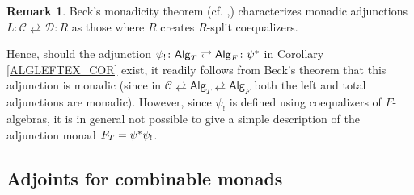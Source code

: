 \documentclass[a4paper,10pt
,draft
]{article}%
\numberwithin{equation}{section}
\numberwithin{figure}{section}
\theoremstyle{definition} %
\newtheorem{remark}[equation]{Remark}%
\newcommand{\Alg}{\mathsf{Alg}}
\newcommand{\1}{\ensuremath{\mathbbm 1}}%
\begin{document}


\begin{remark}\label{ADJSRMON REM}
Beck's monadicity theorem (cf. \cite[VI.7 Thm. 1]{McL},\cite[Thm. 5.5.1]{Ri17})
characterizes monadic adjunctions $L\colon \mathcal{C} \rightleftarrows \mathcal{D}\colon R$
as those where $R$ creates $R$-split coequalizers. 

Hence, should the adjunction 
$\psi_! \colon \Alg_T \rightleftarrows \Alg_F \colon \psi^{\**}$
in Corollary \ref{ALGLEFTEX_COR} exist,
it readily follows from Beck's theorem that this adjunction is monadic
(since in 
$\mathcal{C} \rightleftarrows
\mathsf{Alg}_T \rightleftarrows
\Alg_F$
both the left and total adjunctions are monadic).
However, since $\psi_!$ is defined using coequalizers of $F$-algebras,
it is in general not possible to give a simple description of the adjunction monad
$F_T = \psi^{\**} \psi_!$.
%
\end{remark}


\subsection{Adjoints for combinable monads}
\end{document}
